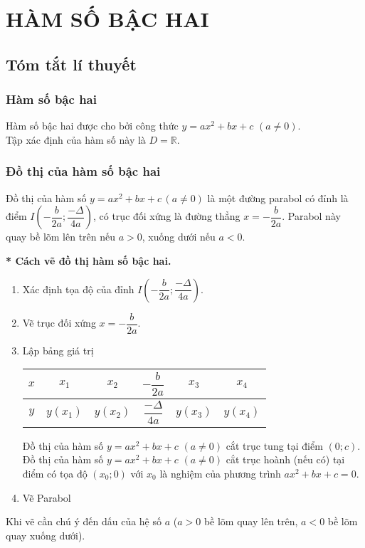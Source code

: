 \section{HÀM SỐ BẬC HAI}
\subsection{Tóm tắt lí thuyết}
\subsubsection{Hàm số bậc hai}
\begin{dn}
    Hàm số bậc hai được cho bởi công thức $y=ax^2+bx+c$ $(a\neq 0)$.\\
    Tập xác định của hàm số này là $D= \mathbb{R}$.
\end{dn}
\subsubsection{Đồ thị của hàm số bậc hai}
\begin{dn}
Đồ thị của hàm số $y=ax^2+bx+c\, \left(a\ne 0\right)$ là một đường parabol có đỉnh là điểm $I\left(-\dfrac{b}{2a};\dfrac{-\Delta}{4a}\right)$, có trục đối xứng là đường thẳng $x=-\dfrac{b}{2a}$. Parabol này quay bề lõm lên trên nếu $a>0$, xuống dưới nếu $a<0$.
\end{dn}
\textbf{* Cách vẽ đồ thị hàm số bậc hai.}
\begin{enumerate}
    \item Xác định tọa độ của đỉnh $I\left(-\dfrac{b}{2a};\dfrac{-\Delta}{4a}\right)$.
    \item Vẽ trục đối xứng $x=-\dfrac{b}{2a}$.
    \item Lập bảng giá trị
    \begin{center}
     \begin{longtable}{|c|ccccc|}
         \hline
        $x$& $x_1$&$x_2$ &$-\dfrac{b}{2a}$ & $x_3$&$x_4$ \\
        \hline 
        $y$ &$y\left(x_1\right)$&$y\left(x_2\right)$ & $\dfrac{-\Delta}{4a}$ &$y\left(x_3\right)$ &$y\left(x_4\right)$\\
        \hline
     \end{longtable}
    \end{center}
\begin{note}
    Đồ thị của hàm số $y=ax^2 + bx + c$ $(a \neq 0)$ cắt trục tung tại điểm $(0;c)$.\\
    Đồ thị của hàm số $y=ax^2 + bx + c$ $(a \neq 0)$ cắt trục hoành (nếu có) tại điểm có tọa độ $(x_0;0)$ với $x_0$ là nghiệm của phương trình $ax^2+bx+c=0$.
\end{note}
\item Vẽ Parabol
\end{enumerate}
\begin{note}
Khi vẽ cần chú ý đến dấu của hệ số $a$ ($a>0$ bề lõm quay lên trên, $a<0$ bề lõm quay xuống dưới).
\end{note}
